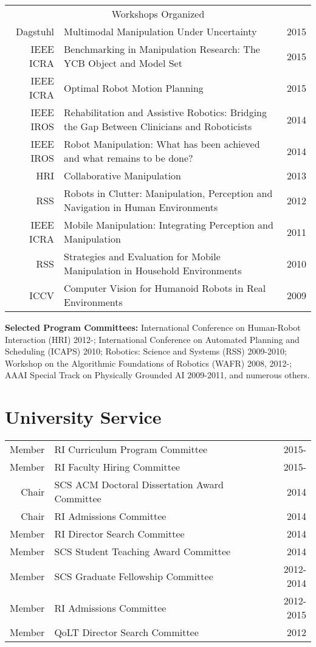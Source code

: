 \documentclass[10pt]{article}
\begin{document}
\begin{tabularx}{\linewidth}{rXr}
\multicolumn{3}{c}{Workshops Organized}\\
Dagstuhl & Multimodal Manipulation Under Uncertainty & 2015\\
IEEE ICRA & Benchmarking in Manipulation Research: The YCB Object and Model Set & 2015\\
IEEE ICRA & Optimal Robot Motion Planning & 2015\\
IEEE IROS & Rehabilitation and Assistive Robotics: Bridging the Gap Between Clinicians and Roboticists & 2014\\
IEEE IROS & Robot Manipulation: What has been achieved and what remains to be done? & 2014\\
HRI & Collaborative Manipulation & 2013\\
RSS & Robots in Clutter: Manipulation, Perception and Navigation in Human Environments & 2012\\
IEEE ICRA & Mobile Manipulation: Integrating Perception and Manipulation & 2011\\
RSS & Strategies and Evaluation for Mobile Manipulation in Household Environments & 2010\\
ICCV  & Computer Vision for Humanoid Robots in Real Environments & 2009\\
\end{tabularx}



\vspace{1em}
\noindent \textbf{Selected Program Committees:} 
International Conference on Human-Robot Interaction (HRI) 2012-;
International Conference on Automated Planning and Scheduling (ICAPS) 2010;
Robotics: Science and Systems (RSS) 2009-2010; 
Workshop on the Algorithmic Foundations of Robotics (WAFR) 2008, 2012-;
AAAI Special Track on Physically Grounded AI 2009-2011,
and numerous others.

\section{University Service}
\begin{tabularx}{\linewidth}{rXr}
Member & RI Curriculum Program Committee & 2015-\\
Member & RI Faculty Hiring Committee & 2015- \\
Chair & SCS ACM Doctoral Dissertation Award Committee & 2014\\
Chair & RI Admissions Committee & 2014 \\
Member & RI Director Search Committee & 2014 \\
Member & SCS Student Teaching Award Committee & 2014 \\
Member & SCS Graduate Fellowship Committee & 2012-2014 \\
Member & RI Admissions Committee & 2012-2015 \\
Member & QoLT Director Search Committee & 2012\\
\end{tabularx}
\newpage
\end{document}
